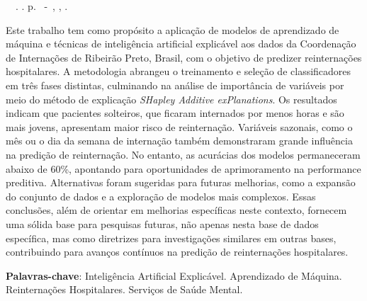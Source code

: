 \setlength{\absparsep}{18pt} %
\begin{resumo}
	\begin{flushleft} 
			\setlength{\absparsep}{0pt} %
			\SingleSpacing 
			\imprimirautorabr~~\textbf{\imprimirtituloresumo}.	\imprimirdata. \pageref{LastPage}p. 
			\imprimirtipotrabalho~-~\imprimirinstituicao, \imprimirlocal, \imprimirdata. 
 	\end{flushleft}
	\OnehalfSpacing 			
	Este trabalho tem como propósito a aplicação de modelos de aprendizado de máquina e técnicas de inteligência artificial explicável aos dados da Coordenação de Internações de Ribeirão Preto, Brasil, com o objetivo de predizer reinternações hospitalares. A metodologia abrangeu o treinamento e seleção de classificadores em três fases distintas, culminando na análise de importância de variáveis por meio do método de explicação \textit{SHapley Additive exPlanations}. Os resultados indicam que pacientes solteiros, que ficaram internados por menos horas e são mais jovens, apresentam maior risco de reinternação. Variáveis sazonais, como o mês ou o dia da semana de internação também demonstraram grande influência na predição de reinternação. No entanto, as acurácias dos modelos permaneceram abaixo de 60\%, apontando para oportunidades de aprimoramento na performance preditiva. Alternativas foram sugeridas para futuras melhorias, como a expansão do conjunto de dados e a exploração de modelos mais complexos. Essas conclusões, além de orientar em melhorias específicas neste contexto, fornecem uma sólida base para pesquisas futuras, não apenas nesta base de dados específica, mas como diretrizes para investigações similares em outras bases, contribuindo para avanços contínuos na predição de reinternações hospitalares.
	
	\vspace{\onelineskip}
	\noindent
	\textbf{Palavras-chave}: Inteligência Artificial Explicável. Aprendizado de Máquina. Reinternações Hospitalares. Serviços de Saúde Mental.
\end{resumo}